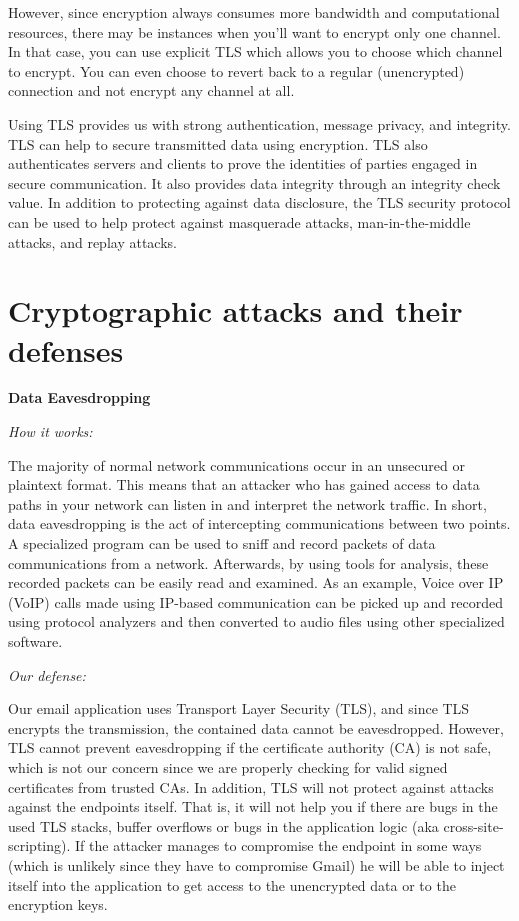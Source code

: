 \documentclass[a4paper,twoside,10pt]{report}
\begin{document}
However, since encryption always consumes more bandwidth and computational resources, there may be instances when you'll want to encrypt only one channel. In that case, you can use explicit TLS which allows you to choose which channel to encrypt.  You can even choose to revert back to a regular (unencrypted) connection and not encrypt any channel at all.

\vspace{2.5mm}

Using TLS provides us with strong authentication, message privacy, and integrity. TLS can help to secure transmitted data using encryption. TLS also authenticates servers and clients to prove the identities of parties engaged in secure communication. It also provides data integrity through an integrity check value. In addition to protecting against data disclosure, the TLS security protocol can be used to help protect against masquerade attacks, man-in-the-middle attacks, and replay attacks.

\noindent
\section{Cryptographic attacks and their defenses}\label{approach}

\noindent
{\large\textbf{Data Eavesdropping}}

\vspace{1mm}
\noindent
\textit{How it works: }

The majority of normal network communications occur in an unsecured or plaintext format. This means that an attacker who has gained access to data paths in your network can listen in and interpret the network traffic. In short, data eavesdropping is the act of intercepting communications between two points. A specialized program can be used to sniff and record packets of data communications from a network. Afterwards, by using tools for analysis, these recorded packets can be easily read and  examined. As an example, Voice over IP (VoIP) calls made using IP-based communication can be picked up and recorded using protocol analyzers and then converted to audio files using other specialized software.

\vspace{2.5mm}
\noindent
\textit{Our defense: }

Our email application uses Transport Layer Security (TLS), and since TLS encrypts the transmission, the contained data cannot be eavesdropped. However, TLS cannot prevent eavesdropping if the certificate authority (CA) is not safe, which is not our concern since we are properly checking for valid signed certificates from trusted CAs. In addition, TLS will not protect against attacks against the endpoints itself. That is, it will not help you if there are bugs in the used TLS stacks, buffer overflows or bugs in the application logic (aka cross-site-scripting). If the attacker manages to compromise the endpoint in some ways (which is unlikely since they have to compromise Gmail) he will be able to inject itself into the application to get access to the unencrypted data or to the encryption keys.
\end{document}
